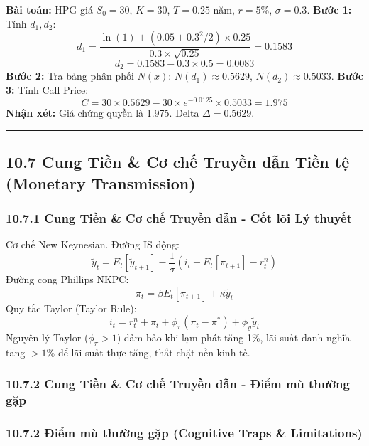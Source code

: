 \documentclass[
]{article}
\begin{document}
\textbf{Bài toán:} HPG giá \(S_0 = 30\), \(K = 30\), \(T = 0.25\) năm,
\(r = 5\%\), \(\sigma = 0.3\). \textbf{Bước 1:} Tính \(d_1, d_2\):
\[ d_1 = \frac{\ln(1) + (0.05 + 0.3^2/2) \times 0.25}{0.3 \times \sqrt{0.25}} = 0.1583 \]
\[ d_2 = 0.1583 - 0.3 \times 0.5 = 0.0083 \] \textbf{Bước 2:} Tra bảng
phân phối \(N(x)\): \(N(d_1) \approx 0.5629\),
\(N(d_2) \approx 0.5033\). \textbf{Bước 3:} Tính Call Price:
\[ C = 30 \times 0.5629 - 30 \times e^{-0.0125} \times 0.5033 = 1.975 \]
\textbf{Nhận xét:} Giá chứng quyền là 1.975. Delta \(\Delta = 0.5629\).

\begin{center}\rule{0.5\linewidth}{0.5pt}\end{center}

\subsection{10.7 Cung Tiền \& Cơ chế Truyền dẫn Tiền tệ (Monetary
Transmission)}\label{cung-tiux1ec1n-cux1a1-chux1ebf-truyux1ec1n-dux1eabn-tiux1ec1n-tux1ec7-monetary-transmission}

\subsubsection{10.7.1 Cung Tiền \& Cơ chế Truyền dẫn - Cốt lõi Lý
thuyết}\label{cung-tiux1ec1n-cux1a1-chux1ebf-truyux1ec1n-dux1eabn---cux1ed1t-luxf5i-luxfd-thuyux1ebft}

Cơ chế New Keynesian. Đường IS động:
\[ \tilde{y}_t = E_t[\tilde{y}_{t+1}] - \frac{1}{\sigma} (i_t - E_t[\pi_{t+1}] - r_t^n) \]
Đường cong Phillips NKPC:
\[ \pi_t = \beta E_t[\pi_{t+1}] + \kappa \tilde{y}_t \] Quy tắc Taylor
(Taylor Rule):
\[ i_t = r_t^n + \pi_t + \phi_{\pi}(\pi_t - \pi^*) + \phi_y \tilde{y}_t \]
Nguyên lý Taylor (\(\phi_{\pi} > 1\)) đảm bảo khi lạm phát tăng 1\%, lãi
suất danh nghĩa tăng \(> 1\%\) để lãi suất thực tăng, thắt chặt nền kinh
tế.

\subsubsection{10.7.2 Cung Tiền \& Cơ chế Truyền dẫn - Điểm mù thường
gặp}\label{cung-tiux1ec1n-cux1a1-chux1ebf-truyux1ec1n-dux1eabn---ux111iux1ec3m-muxf9-thux1b0ux1eddng-gux1eb7p}

\subsubsection{10.7.2 Điểm mù thường gặp (Cognitive Traps \&
Limitations)}\label{ux111iux1ec3m-muxf9-thux1b0ux1eddng-gux1eb7p-cognitive-traps-limitations-88}
\end{document}
